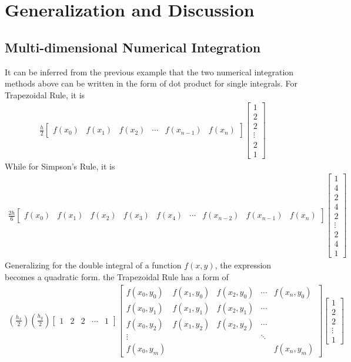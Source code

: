 \section{Generalization and Discussion}
\subsection{Multi-dimensional Numerical Integration}
It can be inferred from the previous example that the two numerical integration methods above can be written in the form of dot product for single integrals. For Trapezoidal Rule, it is 
\begin{align*}
\frac{h}{2}
\begin{bmatrix}
f(x_0) & f(x_1) & f(x_2) & \cdots & f(x_{n-1}) & f(x_n)
\end{bmatrix}
\begin{bmatrix}
1 \\
2 \\
2 \\
\vdots \\
2 \\
1
\end{bmatrix}
\end{align*}
While for Simpson's Rule, it is
\begin{align*}
\frac{2h}{6}
\begin{bmatrix}
f(x_0) & f(x_1) & f(x_2) & f(x_3) & f(x_4) & \cdots & f(x_{n-2}) & f(x_{n-1}) & f(x_n)
\end{bmatrix}
\begin{bmatrix}
1 \\
4 \\
2 \\
4 \\
2 \\
\vdots \\
2 \\
4 \\
1
\end{bmatrix}
\end{align*}
Generalizing for the double integral of a function $f(x,y)$, the expression becomes a quadratic form. the Trapezoidal Rule has a form of
\begin{align*}
(\frac{h_x}{2})(\frac{h_y}{2})
\begin{bmatrix}
1 & 2 & 2 & \cdots & 1
\end{bmatrix}
\begin{bmatrix}
f(x_0,y_0) & f(x_1, y_0) & f(x_2, y_0) & \cdots & f(x_n, y_0) \\
f(x_0,y_1) & f(x_1, y_1) & f(x_2, y_1) & \cdots & \\
f(x_0,y_2) & f(x_1, y_2) & f(x_2, y_2) & \cdots & \\
\vdots & & & \ddots & \\
f(x_0,y_m) & & & & f(x_n,y_m)
\end{bmatrix}
\begin{bmatrix}
1 \\
2 \\
2 \\
\vdots \\
1
\end{bmatrix}   
\end{align*}
